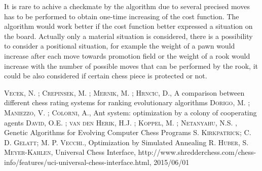 \documentclass[pdftex]{article}
\begin{document}
It is rare to achive a checkmate by the algorithm due to several precised moves has to be performed to obtain one-time increasing of the cost function. The algorithm would work better if the cost function better expressed a situation on the board. Actually only a material situation is considered, there is a possibility to consider a positional situation, for example the weight of a pawn would increase after each move towards promotion field or the weight of a rook would increase with the number of possible moves that can be performed by the rook, it could be also considered if certain chess piece is protected or not.

\begin{thebibliography}{99}

 \textsc{Vecek, N. ; Crepinsek, M. ; Mernik, M. ; Hrncic, D.}, A comparison between different chess rating systems for ranking evolutionary algorithms 
 \textsc{Dorigo, M. ; Maniezzo, V. ; Colorni, A.}, Ant system: optimization by a colony of cooperating agents 
 \textsc{David, O.E. ; van den Herik, H.J. ; Koppel, M. ; Netanyahu, N.S. }, Genetic Algorithms for Evolving Computer Chess Programs 
 \textsc{S. Kirkpatrick; C. D. Gelatt; M. P. Vecchi.}, Optimization by Simulated Annealing 
 \textsc{R. Huber, S. Meyer-Kahlen}, Universal Chess Interface, http://www.shredderchess.com/chess-info/features/uci-universal-chess-interface.html, 2015/06/01

\end{thebibliography}
\end{document}
